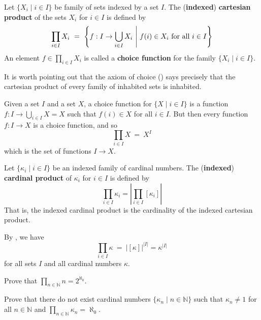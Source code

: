 \begin{definition}
\label{defIndexedCartesianProduct}
Let $\{ X_i \mid i \in I \}$ be family of sets indexed by a set $I$. The (\textbf{indexed}) \textbf{cartesian product} of the sets $X_i$ for $i \in I$ is defined by
\[ \prod_{i \in I} X_i ~=~ \left\{ f : I \to \bigcup_{i \in I} X_i \middlemid f(i) \in X_i \text{ for all } i \in I \right\} \]
An element $f \in \prod_{i \in I} X_i$ is called a \textbf{choice function} for the family $\{ X_i \mid i \in I \}$.
\end{definition}

It is worth pointing out that the axiom of choice () says precisely that the cartesian product of every family of inhabited sets is inhabited.

\begin{example}
\label{exCartesianProductOfConstantFamily}
Given a set $I$ and a set $X$, a choice function for $\{ X \mid i \in I \}$ is a function $\displaystyle f : I \to \bigcup_{i \in I} X = X$ such that $f(i) \in X$ for all $i \in I$. But then every function $f : I \to X$ is a choice function, and so
\[ \prod_{i \in I} X ~=~ X^I \]
which is the set of functions $I \to X$.
\end{example}

\begin{definition}
\label{defIndexedCardinalProduct}
Let $\{ \kappa_i \mid i \in I \}$ be an indexed family of cardinal numbers. The (\textbf{indexed}) \textbf{cardinal product} of $\kappa_i$ for $i \in I$ is defined by
\[ \prod_{i \in I} \kappa_i = \left| \prod_{i \in I} [\kappa_i] \right| \]
That is, the indexed cardinal product is the cardinality of the indexed cartesian product.
\end{definition}

\begin{example}
By , we have
\[ \prod_{i \in I} \kappa ~=~ |[\kappa]|^{|I|} = \kappa^{|I|} \]
for all sets $I$ and all cardinal numbers $\kappa$.
\end{example}

\begin{exercise}
Prove that $\displaystyle \prod_{n \in \mathbb{N}} n = 2^{\aleph_0}$.
\end{exercise}

\begin{exercise}
Prove that there do not exist cardinal numbers $\{ \kappa_n \mid n \in \mathbb{N} \}$ such that $\kappa_n \ne 1$ for all $n \in \mathbb{N}$ and $\displaystyle \prod_{n \in \mathbb{N}} \kappa_n = \aleph_0$.
\end{exercise}
